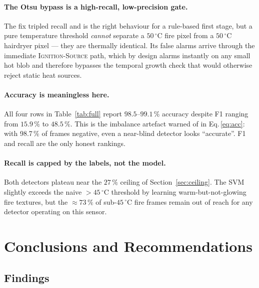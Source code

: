\documentclass[11pt, a4paper]{article}
\begin{document}
\paragraph{The Otsu bypass is a high-recall, low-precision gate.}  The fix tripled recall
and is the right behaviour for a rule-based first stage, but a pure temperature threshold
\emph{cannot} separate a $50\,^\circ$C fire pixel from a $50\,^\circ$C hairdryer pixel —
they are thermally identical.  Its false alarms arrive through the immediate
\textsc{Ignition-Source} path, which by design alarms instantly on any small hot blob and
therefore bypasses the temporal growth check that would otherwise reject static heat
sources.

\paragraph{Accuracy is meaningless here.}  All four rows in Table~\ref{tab:full} report
$98.5$--$99.1\,\%$ accuracy despite F1 ranging from $15.9\,\%$ to $48.5\,\%$.  This is the
imbalance artefact warned of in Eq.\,\ref{eq:acc}: with 98.7\,\% of frames negative, even
a near-blind detector looks ``accurate''.  F1 and recall are the only honest rankings.

\paragraph{Recall is capped by the labels, not the model.}  Both detectors plateau near
the $27\,\%$ ceiling of Section~\ref{sec:ceiling}.  The SVM slightly exceeds the naive
$>45\,^\circ$C threshold by learning warm-but-not-glowing fire textures, but the
$\approx73\,\%$ of sub-$45\,^\circ$C fire frames remain out of reach for any detector
operating on this sensor.

\section{Conclusions and Recommendations}\label{sec:reco}

\subsection{Findings}
\end{document}
